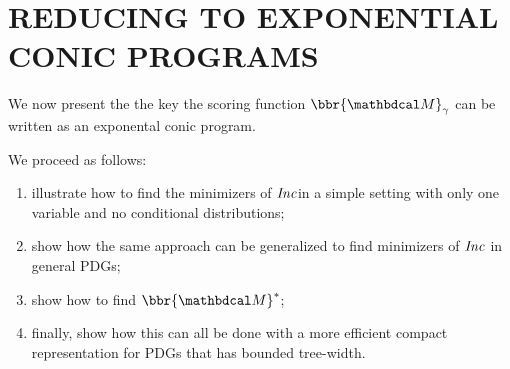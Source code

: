 \documentclass[twoside]{article}
\begin{document}
\section{REDUCING TO EXPONENTIAL CONIC PROGRAMS} 

    \label{sec:reductions}
We now present the the key 
the scoring function $\bbr{\dg M}_\gamma$
can be written as an exponental conic program. 

We proceed as follows: 
\begin{enumerate}[itemsep=0pt]
    \item
      illustrate how to find the minimizers of $\mathit{Inc}$in a simple 
      setting with only one variable and no conditional distributions; 

    \item
    show how the same approach can be generalized to find minimizers 
    of $\mathit{Inc}$ in general PDGs; 
    \item \label{item:+idef}
    show how to find $\bbr{\dg M}^*$;
    \item 
    finally, show how this can all be done
    with a more efficient compact representation for PDGs that has
    bounded tree-width.
\end{enumerate}
\end{document}
